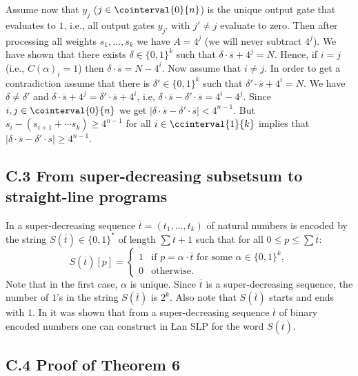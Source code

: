 Assume now that $y_j$ ($j \in \cointerval{0}{n}$) is the unique output gate that evaluates to $1$, i.e., all
output gates $y_{j'}$ with $j' \neq j$ evaluate to zero. Then after processing all weights
$s_1,\ldots,s_k$ we have $A = 4^j$ (we will never subtract $4^j$). We have shown that there exists
$\delta \in \{0,1\}^k$ such that $\delta \cdot \overline{s} + 4^j = N$. Hence, if $i=j$ (i.e., $C(\alpha)_i = 1$)
then  $\delta \cdot \overline{s} = N-4^i$. Now assume that $i \neq j$. In order to get a contradiction assume 
that there is $\delta' \in \{0,1\}^k$ such that $\delta' \cdot \overline{s} + 4^i = N$. We have $\delta \neq \delta'$ and 
$\delta \cdot \overline{s} + 4^j  = \delta' \cdot \overline{s} + 4^i$, i.e, $\delta \cdot \overline{s} - \delta' \cdot \overline{s} = 4^i - 4^j$.
Since $i,j \in \cointerval{0}{n}$ we get $|\delta \cdot \overline{s} - \delta' \cdot \overline{s}| < 4^{n-1}$. But 
$s_i - (s_{i+1} + \cdots s_k) \geq 4^{n-1}$ for all $i \in \ccinterval{1}{k}$ implies that 
$|\delta \cdot \overline{s} - \delta' \cdot \overline{s}| \ge 4^{n-1}$.

\subsection*{C.3 From super-decreasing subsetsum to straight-line programs} \label{sec-subsetsum-SLP}

In \cite{ref35} a super-decreasing sequence $\overline{t} = (t_1,\ldots,t_k)$ of natural numbers is encoded by the string 
$S(\overline{t}) \in \{0,1\}^*$ of length $\sum \overline{t} +1$
such that for all $0 \leq p \leq \sum \overline{t}$:
\begin{equation}\label{main string}
S(\overline{t})[p] = \begin{cases} 1 & \text{if $p = \alpha \cdot \overline{t}$ for some $\alpha  \in \{0,1\}^k$}, \\
0 & \text{otherwise}.
\end{cases}
\end{equation}
Note that in the first case, $\alpha$ is unique.
Since $\overline{t}$ is a super-decreasing sequence, 
the number of $1$'s in the string $S(\overline{t})$ is $2^k$.
Also note that $S(\overline{t})$ starts and ends with $1$.
In \cite{ref35} it was shown that from a super-decreasing sequence $\overline{t}$
of binary encoded numbers one can construct in \L an SLP for 
the word $S(\overline{t})$.



   
\subsection*{C.4 Proof of Theorem 6} \label{sec:leaf-wreath}

